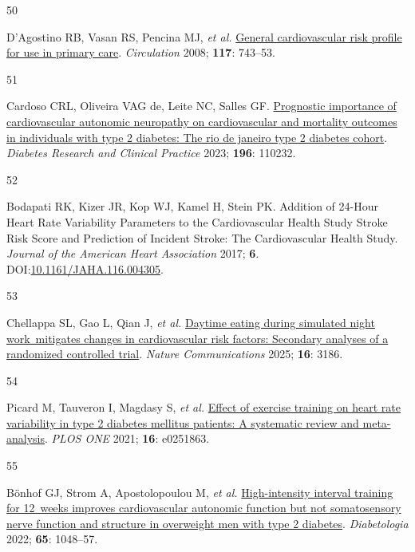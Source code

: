 \documentclass[
  a4paper,
  headsepline=true,
  open=any]{scrbook}
\newlength{\cslhangindent}
\newlength{\csllabelwidth}
\newlength{\cslentryspacingunit} %
\newenvironment{CSLReferences}[2] %
 {%
  \setlength{\parindent}{0pt}
  \ifodd #1
  \let\oldpar\par
  \def\par{\hangindent=\cslhangindent\oldpar}
  \fi
  \setlength{\parskip}{#2\cslentryspacingunit}
 }%
 {}
\newcommand{\CSLLeftMargin}[1]{\parbox[t]{\csllabelwidth}{#1}}
\newcommand{\CSLRightInline}[1]{\parbox[t]{\linewidth - \csllabelwidth}{#1}\break}
\begin{document}
\begin{CSLReferences}{0}{0}
\leavevmode{}%
\CSLLeftMargin{50 }%
\CSLRightInline{D'Agostino RB, Vasan RS, Pencina MJ, \emph{et al.}
\href{https://doi.org/10.1161/CIRCULATIONAHA.107.699579}{General
cardiovascular risk profile for use in primary care}. \emph{Circulation}
2008; \textbf{117}: 743--53.}

\leavevmode{}%
\CSLLeftMargin{51 }%
\CSLRightInline{Cardoso CRL, Oliveira VAG de, Leite NC, Salles GF.
\href{https://doi.org/10.1016/j.diabres.2022.110232}{Prognostic
importance of cardiovascular autonomic neuropathy on cardiovascular and
mortality outcomes in individuals with type 2 diabetes: The rio de
janeiro type 2 diabetes cohort}. \emph{Diabetes Research and Clinical
Practice} 2023; \textbf{196}: 110232.}

\leavevmode{}%
\CSLLeftMargin{52 }%
\CSLRightInline{Bodapati RK, Kizer JR, Kop WJ, Kamel H, Stein PK.
Addition of 24-Hour Heart Rate Variability Parameters to the
Cardiovascular Health Study Stroke Risk Score and Prediction of Incident
Stroke: The Cardiovascular Health Study. \emph{Journal of the American
Heart Association} 2017; \textbf{6}.
DOI:\href{https://doi.org/10.1161/JAHA.116.004305}{10.1161/JAHA.116.004305}.}

\leavevmode{}%
\CSLLeftMargin{53 }%
\CSLRightInline{Chellappa SL, Gao L, Qian J, \emph{et al.}
\href{https://doi.org/10.1038/s41467-025-57846-y}{Daytime eating during
simulated night work~mitigates changes in cardiovascular risk factors:
Secondary analyses of a randomized controlled trial}. \emph{Nature
Communications} 2025; \textbf{16}: 3186.}

\leavevmode{}%
\CSLLeftMargin{54 }%
\CSLRightInline{Picard M, Tauveron I, Magdasy S, \emph{et al.}
\href{https://doi.org/10.1371/journal.pone.0251863}{Effect of exercise
training on heart rate variability in type 2 diabetes mellitus patients:
A systematic review and meta-analysis}. \emph{PLOS ONE} 2021;
\textbf{16}: e0251863.}

\leavevmode{}%
\CSLLeftMargin{55 }%
\CSLRightInline{Bönhof GJ, Strom A, Apostolopoulou M, \emph{et al.}
\href{https://doi.org/10.1007/s00125-022-05674-w}{High-intensity
interval training for 12~weeks improves cardiovascular autonomic
function but not somatosensory nerve function and structure in
overweight men with type 2 diabetes}. \emph{Diabetologia} 2022;
\textbf{65}: 1048--57.}


\end{CSLReferences}
\end{document}
